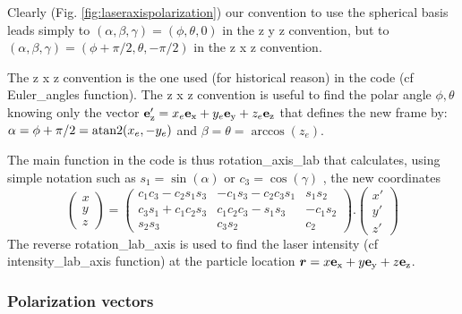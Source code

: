 \documentclass[amsmath,amssymb,nofootinbib]{revtex4-2}
\begin{document}
 	 	 	 	 Clearly (Fig.
 	 	 	 	 \ref{fig:laseraxispolarization}) our convention to use 
 	 	 	 	the spherical basis leads simply to 
 	 	 	 	$(\alpha,\beta,\gamma) = 	(\phi,\theta,0)$  in the 
	 	z y z convention, but to  $(\alpha,\beta,\gamma) = 	(\phi+\pi/2,\theta,-\pi/2)$ in the  z x z  convention.
	 	
	 	 The z x z convention is the one used (for historical reason) in the code (cf Euler\_angles function).
	 	 The z x z  convention is useful to find the polar angle $\phi,\theta$ knowing only the vector ${\bf{e}}'_{\rm z} = x_e {\bf{e}}_{\rm x} + y_e {\bf{e}}_{\rm y} + z_e {\bf{e}}_{\rm z}  $ that defines the new frame  by:
	 	  $\alpha = \phi+\pi/2 = {\rm atan2}(x_e, - y_e)$ and  $\beta = \theta =  \arccos(z_e)$.
	 	  
	 	  The main function in the code is thus rotation\_axis\_lab   that calculates, 	 	using simple notation such as $s_1 = \sin (\alpha)$ or $c_3 = \cos (\gamma)$  ,  the new coordinates
	 	 $$ \begin{pmatrix} x \\ y \\ z
	 	 \end{pmatrix}
	 	  =\begin{pmatrix}c_{1}c_{3}-c_{2}s_{1}s_{3}&-c_{1}s_{3}-c_{2}c_{3}s_{1}&s_{1}s_{2}\\c_{3}s_{1}+c_{1}c_{2}s_{3}&c_{1}c_{2}c_{3}-s_{1}s_{3}&-c_{1}s_{2}\\s_{2}s_{3}&c_{3}s_{2}&c_{2}\end{pmatrix}.  \begin{pmatrix} x' \\ y' \\ z'
	 	  \end{pmatrix}$$
	 	 	The reverse rotation\_lab\_axis is  used to find the laser intensity (cf intensity\_lab\_axis function) at the particle location $\bm r  = x {\bf{e}}_{\rm x} + y {\bf{e}}_{\rm y} + z {\bf{e}}_{\rm z}  $.
 	 	 	\subsubsection{Polarization vectors}
 	 	 	\label{pol_vector}
	 	 
	 	 
\end{document}
